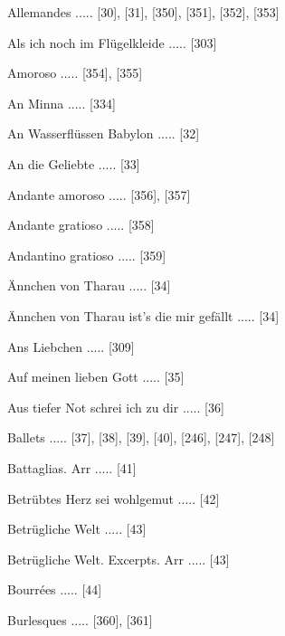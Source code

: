\documentclass[twocolumn, 12pt]{book}
\begin{document}
\newline 
Allemandes ..... [30], [31], [350], [351], [352], [353]

\newline 
Als ich noch im Flügelkleide ..... [303]

\newline 
Amoroso ..... [354], [355]

\newline 
An Minna ..... [334]

\newline 
An Wasserflüssen Babylon ..... [32]

\newline 
An die Geliebte ..... [33]

\newline 
Andante amoroso ..... [356], [357]

\newline 
Andante gratioso ..... [358]

\newline 
Andantino gratioso ..... [359]

\newline 
Ännchen von Tharau ..... [34]

\newline 
Ännchen von Tharau ist's die mir gefällt ..... [34]

\newline 
Ans Liebchen ..... [309]

\newline 
Auf meinen lieben Gott ..... [35]

\newline 
Aus tiefer Not schrei ich zu dir ..... [36]

\newline 
Ballets ..... [37], [38], [39], [40], [246], [247], [248]

\newline 
Battaglias. Arr ..... [41]

\newline 
Betrübtes Herz sei wohlgemut ..... [42]

\newline 
Betrügliche Welt ..... [43]

\newline 
Betrügliche Welt. Excerpts. Arr ..... [43]

\newline 
Bourrées ..... [44]

\newline 
Burlesques ..... [360], [361]
\end{document}
